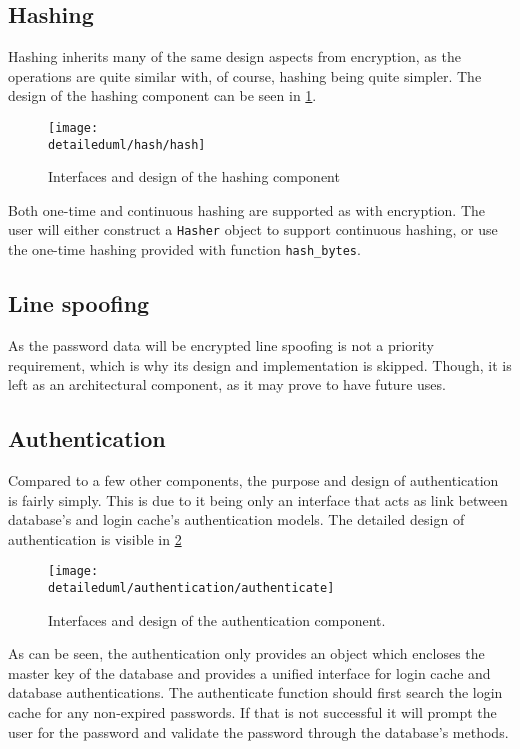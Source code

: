 \subsection{Hashing}

Hashing inherits many of the same design aspects from encryption, as the
operations are quite similar with, of course, hashing being quite simpler.
The design of the hashing component can be seen in \ref{dia:hash_design}.

\begin{figure}[H]
    \centering
    \centerline{\texttt{[image: \\detaileduml/hash/hash]}}
    \caption{Interfaces and design of the hashing component}
    \label{dia:hash_design}
\end{figure}

Both one-time and continuous hashing are supported as with encryption. The user
will either construct a \texttt{Hasher} object to support continuous hashing, or
use the one-time hashing provided with function \texttt{hash\_bytes}.

\subsection{Line spoofing}

As the password data will be encrypted line spoofing is not a priority
requirement, which is why its design and implementation is skipped. Though, it
is left as an architectural component, as it may prove to have future uses.

\subsection{Authentication}

Compared to a few other components, the purpose and design of authentication is
fairly simply. This is due to it being only an interface that acts as link
between database's and login cache's authentication models. The detailed design
of authentication is visible in \ref{dia:auth_design}

\begin{figure}[H]
    \centering
    \centerline{\texttt{[image: \\detaileduml/authentication/authenticate]}}
    \caption{Interfaces and design of the authentication component.}
    \label{dia:auth_design}
\end{figure}

As can be seen, the authentication only provides an object which encloses the
master key of the database and provides a unified interface for login cache and
database authentications. The authenticate function should first search the
login cache for any non-expired passwords. If that is not successful it
will prompt the user for the password and validate the password through the
database's methods.

